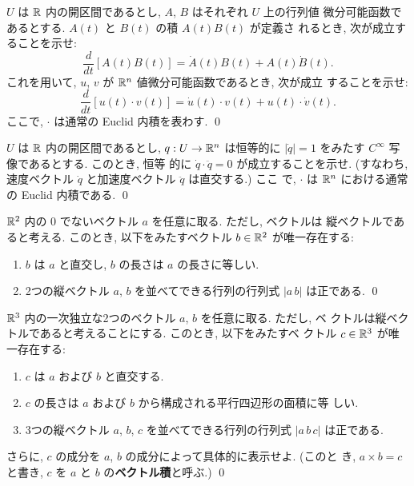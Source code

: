 \documentclass[12pt,twoside]{jarticle}
\begin{document}
\begin{question}[微分のLeibnitz則]
  $U$ は ${\mathbb R}$ 内の開区間であるとし, $A$, $B$ はそれぞれ $U$ 上の行列値
  微分可能函数であるとする. $A(t)$ と $B(t)$ の積 $A(t)B(t)$ が定義さ
  れるとき, 次が成立することを示せ:
  \[
    \frac{d}{dt}\left[A(t)B(t)\right]
    = \dot{A}(t) B(t) + A(t) \dot{B}(t).
  \]
  これを用いて, $u$, $v$ が ${\mathbb R}^n$ 値微分可能函数であるとき, 次が成立
  することを示せ:
  \[
    \frac{d}{dt}\left[u(t)\cdot v(t)\right]
    = \dot{u}(t) \cdot v(t) + u(t) \cdot \dot{v}(t).
  \]
  ここで, $\cdot$ は通常の Euclid 内積を表わす. \qed
\end{question}

\begin{question}
  $U$ は ${\mathbb R}$ 内の開区間であるとし, $q : U \to {\mathbb R}^n$ は恒等的に 
  $|\dot{q}| = 1$ をみたす $C^\infty$ 写像であるとする. このとき, 恒等
  的に $\dot{q} \cdot \ddot{q} = 0$ が成立することを示せ. (すなわち, 
  速度ベクトル $\dot{q}$ と加速度ベクトル $\ddot{q}$ は直交する.) ここ
  で, $\cdot$ は ${\mathbb R}^n$ における通常の Euclid 内積である. \qed
\end{question}

\begin{question}
  ${\mathbb R}^2$ 内の $0$ でないベクトル $a$ を任意に取る. ただし, ベクトルは
  縦ベクトルであると考える. %
  このとき, 以下をみたすベクトル $b \in {\mathbb R}^2$ が唯一存在する:
  \begin{enumerate}
  \item $b$ は $a$ と直交し, $b$ の長さは $a$ の長さに等しい.
  \item 2つの縦ベクトル $a$, $b$ を並べてできる行列の行列式 $|a\, b|$ %
    は正である.  \qed
  \end{enumerate}
\end{question}

\begin{question}[ベクトル積]\label{q:vector-prod}
  ${\mathbb R}^3$ 内の一次独立な2つのベクトル $a$, $b$ を任意に取る. ただし, ベ
  クトルは縦ベクトルであると考えることにする. このとき, 以下をみたすベ
  クトル $c \in {\mathbb R}^3$ が唯一存在する:
  \begin{enumerate}
  \item $c$ は $a$ および $b$ と直交する.
  \item $c$ の長さは $a$ および $b$ から構成される平行四辺形の面積に等
    しい.
  \item 3つの縦ベクトル $a$, $b$, $c$ を並べてできる行列の行列式 %
    $|a\, b\, c|$ は正である.
  \end{enumerate}
  さらに, $c$ の成分を $a$, $b$ の成分によって具体的に表示せよ. (このと
  き, $a \times b = c$ と書き, $c$ を $a$ と $b$ の{\bf ベクトル積}と呼ぶ.)
  \qed
\end{question}
\end{document}
